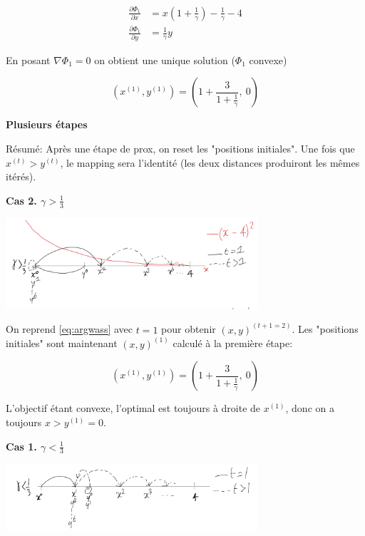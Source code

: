 \begin{align}
	\frac{\partial \varPhi_1}{\partial x} &= x \left( 1 + \frac{1}{\gamma} \right) - \frac{1}{\gamma} - 4 \\
	\frac{\partial \varPhi_1}{\partial y} &= \frac{1}{\gamma} y
\end{align}

En posant $\nabla \varPhi_1 = 0$ on obtient une unique solution ($\varPhi_1$ convexe)

\begin{equation}
	(x^{(1)}, y^{(1)}) = (1 + \frac{3}{1+\frac{1}{\gamma}}, \ 0)
\end{equation}

\textbf{Plusieurs étapes}

Résumé: Après une étape de prox, on reset les "positions initiales". Une fois que $x^{(t)}>y^{(t)}$, le mapping sera l'identité (les deux distances produiront les mêmes itérés).



\textbf{Cas 2. $\gamma > \frac{1}{3}$}

\includegraphics[width=0.7\textwidth]{imgs/schema_big_gamma.png}

On reprend \cref{eq:argwass} avec $t=1$ pour obtenir $(x,y)^{(t+1=2)}$. Les "positions initiales" sont maintenant $(x,y)^{(1)}$ calculé à la première étape:

\begin{equation}
	(x^{(1)}, y^{(1)}) = (1 + \frac{3}{1+\frac{1}{\gamma}}, \ 0)
\end{equation}

L'objectif étant convexe, l'optimal est toujours à droite de $x^{(1)}$, donc on a toujours $x > y^{(1)} = 0$.

\textbf{Cas 1. $\gamma < \frac{1}{3}$}

\includegraphics[width=0.7\textwidth]{imgs/schema_small_gamma.png}

